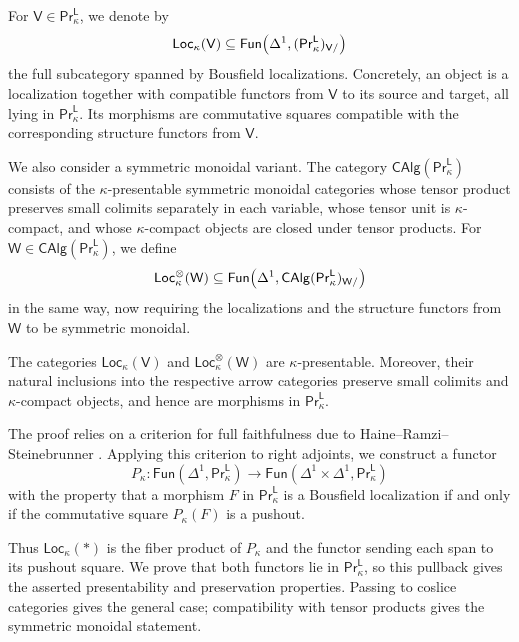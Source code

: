 For $\mathsf{V}\in\mathsf{Pr}^{\mathsf{L}}_\kappa$, we denote by
\[\mathsf{Loc}_\kappa(\mathsf{V})\subseteq\mathsf{Fun}\mleft(\Delta^1,(\mathsf{Pr}^{\mathsf{L}}_\kappa)_{\mathsf{V}/}\mright)\]
the full subcategory spanned by Bousfield localizations. Concretely, an object is a localization together with compatible functors from $\mathsf{V}$ to its source and target, all lying in $\mathsf{Pr}^{\mathsf{L}}_\kappa$. Its morphisms are commutative squares compatible with the corresponding structure functors from $\mathsf{V}$.

We also consider a symmetric monoidal variant. The category $\mathsf{CAlg}(\mathsf{Pr}^{\mathsf{L}}_\kappa)$ consists of the $\kappa$-presentable symmetric monoidal categories whose tensor product preserves small colimits separately in each variable, whose tensor unit is $\kappa$-compact, and whose $\kappa$-compact objects are closed under tensor products. For $\mathsf{W}\in\mathsf{CAlg}(\mathsf{Pr}^{\mathsf{L}}_\kappa)$, we define
\[\mathsf{Loc}^\otimes_\kappa(\mathsf{W})\subseteq\mathsf{Fun}\mleft(\Delta^1,\mathsf{CAlg}(\mathsf{Pr}^{\mathsf{L}}_\kappa)_{\mathsf{W}/}\mright)\]
in the same way, now requiring the localizations and the structure functors from $\mathsf{W}$ to be symmetric monoidal.

\begin{introthm}[\ref{walking localization}, \ref{result on monoidal localizations}]\label{thm A}
The categories $\mathsf{Loc}_\kappa(\mathsf{V})$ and $\mathsf{Loc}^\otimes_\kappa(\mathsf{W})$ are $\kappa$-presentable. Moreover, their natural inclusions into the respective arrow categories preserve small colimits and $\kappa$-compact objects, and hence are morphisms in $\mathsf{Pr}^{\mathsf{L}}_\kappa$.
\end{introthm}

The proof relies on a criterion for full faithfulness due to Haine--Ramzi--Steinebrunner \cite[Prop.~1.4]{haine2025fullyfaithfulfunctorspushouts}. Applying this criterion to right adjoints, we construct a functor
\[P_\kappa\colon\mathsf{Fun}(\Delta^1,\mathsf{Pr}^{\mathsf{L}}_\kappa)\to\mathsf{Fun}(\Delta^1\times\Delta^1,\mathsf{Pr}^{\mathsf{L}}_\kappa)\]
with the property that a morphism $F$ in $\mathsf{Pr}^{\mathsf{L}}_\kappa$ is a Bousfield localization if and only if the commutative square $P_\kappa(F)$ is a pushout.

Thus $\mathsf{Loc}_\kappa(\ast)$ is the fiber product of $P_\kappa$ and the functor sending each span to its pushout square. We prove that both functors lie in $\mathsf{Pr}^{\mathsf{L}}_\kappa$, so this pullback gives the asserted presentability and preservation properties. Passing to coslice categories gives the general case; compatibility with tensor products gives the symmetric monoidal statement.

